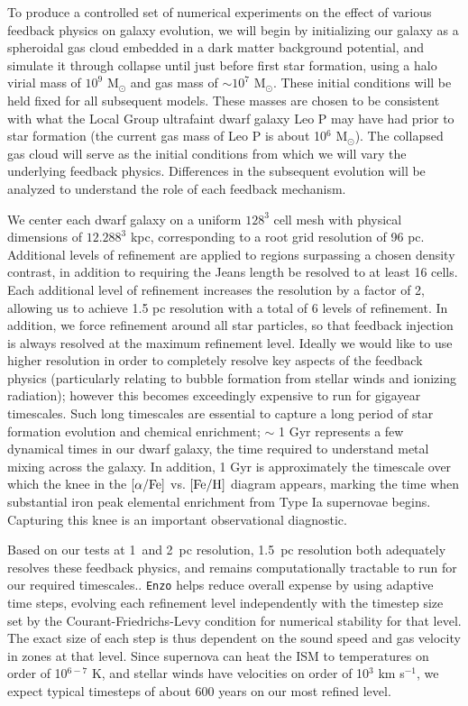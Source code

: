 \documentclass[11pt]{article}
\begin{document}
To produce a controlled set of numerical experiments on the effect of various feedback physics on galaxy evolution, we will begin by initializing our galaxy as a spheroidal gas cloud embedded in a dark matter background potential, and simulate it through collapse until just before first star formation, using a halo virial mass of $10^{9}$ M$_{\odot}$ and gas mass of $\sim10^{7}$ M$_{\odot}$. These initial conditions will be held fixed for all subsequent models. These masses are chosen to be consistent with what the Local Group ultrafaint dwarf galaxy Leo P \citep{McQuinn2013, Giovanelli2013, Skillman2013, McQuinn2015} may have had prior to star formation (the current gas mass of Leo P is about 10$^{6}$ M$_{\odot}$). The collapsed gas cloud will serve as the initial conditions from which we will vary the underlying feedback physics. Differences in the subsequent evolution will be analyzed to understand the role of each feedback mechanism. 

We center each dwarf galaxy on a uniform $128^3$ cell mesh with physical dimensions of   
$12.288^3$ kpc, corresponding to a root grid resolution of 96 pc. Additional levels of refinement are applied to regions surpassing a chosen density contrast, in addition to requiring the Jeans length be resolved to at least 16 cells. Each additional level of refinement increases the resolution by a factor of 2, allowing us to achieve 1.5 pc resolution with a total of 6 levels of refinement. In addition, we force refinement around all star particles, so that feedback injection is always resolved at the maximum refinement level. Ideally we would like to use higher resolution in order to completely resolve key aspects of the feedback physics (particularly relating to bubble formation from stellar winds and ionizing radiation); however this becomes exceedingly expensive to run for gigayear timescales. Such long timescales are essential to capture a long period of star formation evolution and chemical enrichment; $\sim$ 1 Gyr represents a few dynamical times in our dwarf galaxy, the time required to understand metal mixing across the galaxy. In addition, 1 Gyr is approximately the timescale over which the knee in the $\left[ \alpha / \rm{Fe}\right]$ vs. $\left[\rm{Fe}/\rm{H}\right]$ diagram appears, marking the time when substantial iron peak elemental enrichment from Type Ia supernovae begins. Capturing this knee is an important observational diagnostic.

Based on our tests at 1~and 2~pc resolution, 1.5~pc resolution both adequately resolves these feedback physics, and remains computationally tractable to run for our required timescales.. \texttt{Enzo} helps reduce overall expense by using adaptive time steps, evolving each refinement level independently with the timestep size set by the Courant-Friedrichs-Levy condition for numerical stability for that level. The exact size of each step is thus dependent on the sound speed and gas velocity in zones at that level. Since supernova can heat the ISM to temperatures on order of 10$^{6-7}$ K, and stellar winds have velocities on order of 10$^{3}$ km s$^{-1}$, we expect typical timesteps of about 600 years on our most refined level.
\end{document}
